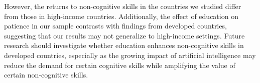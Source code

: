 However, the returns to non-cognitive skills in the countries we studied differ from those in high-income countries. Additionally, the effect of education on patience in our sample contrasts with findings from developed countries, suggesting that our results may not generalize to high-income settings. Future research should investigate whether education enhances non-cognitive skills in developed countries, especially as the growing impact of artificial intelligence may reduce the demand for certain cognitive skills while amplifying the value of certain non-cognitive skills.
